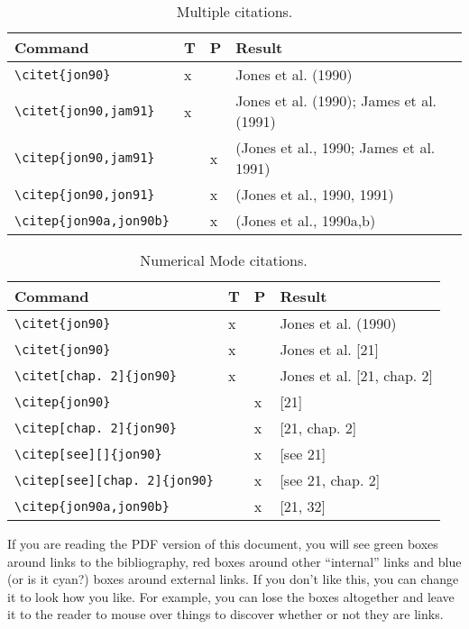 \begin{table}[ht]
    \footnotesize
    \centering
    \caption{Multiple citations.}
    \begin{tabular}[ht]{llll}
	\hline
	Command & T & P & Result \\
	\hline
	\verb|\citet{jon90}| & x & & Jones et al. (1990) \\
	\verb|\citet{jon90,jam91}| & x & & Jones et al. (1990); James et
		al. (1991)\\ 
	\verb|\citep{jon90,jam91}| & & x & (Jones et al., 1990; James
		et al. 1991)\\ 
	\verb|\citep{jon90,jon91}| & & x & (Jones et al., 1990, 1991)\\
	\verb|\citep{jon90a,jon90b}| & & x & (Jones et al., 1990a,b)\\
	\hline
    \end{tabular}
\end{table}

\begin{table}[ht]
    \footnotesize
    \centering
    \caption{Numerical Mode citations.}
    \begin{tabular}[ht]{llll}
	\hline
	Command & T & P & Result \\
	\hline
	\verb|\citet{jon90}| & x & & Jones et al. (1990) \\
	\verb|\citet{jon90}| & x & & Jones et al. [21]\\
	\verb|\citet[chap. 2]{jon90}| & x & & Jones et al. [21, chap. 2]\\
	\verb|\citep{jon90}| & & x & [21]\\
	\verb|\citep[chap. 2]{jon90}| & & x & [21, chap. 2]\\
	\verb|\citep[see][]{jon90}| & & x & [see 21]\\
	\verb|\citep[see][chap. 2]{jon90}| & & x & [see 21, chap. 2]\\
	\verb|\citep{jon90a,jon90b}| & & x & [21, 32]\\
	\hline
    \end{tabular}
\end{table}

If you are reading the PDF version of this document, you will see
green boxes around links to the bibliography, red boxes around other
``internal'' links and blue (or is it cyan?\null) boxes around
external links.  If you don't like this, you can change it to look how
you like.  For example, you can lose the boxes altogether and leave it
to the reader to mouse over things to discover whether or not they are
links.

